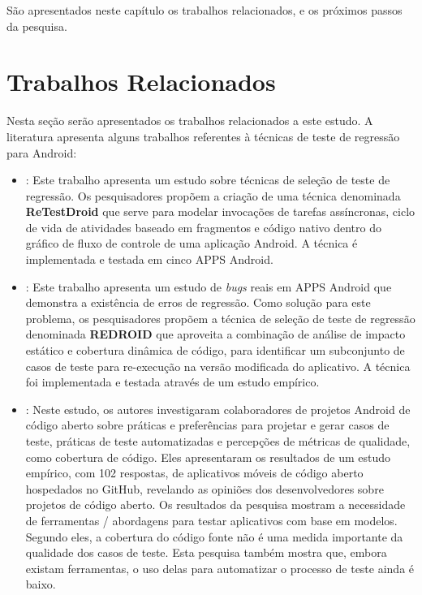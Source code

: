 \acresetall
São apresentados neste capítulo os trabalhos relacionados, e os próximos passos da pesquisa.

\section{Trabalhos Relacionados}

Nesta seção serão apresentados os trabalhos relacionados a este estudo. A literatura apresenta alguns trabalhos referentes à técnicas de teste de regressão para Android:

\begin{itemize}
    
    \item \cite{8377661}: Este trabalho apresenta um estudo sobre técnicas de seleção de teste de regressão. Os pesquisadores propõem a criação de uma técnica denominada \textbf{ReTestDroid} que serve para modelar invocações de tarefas assíncronas, ciclo de vida de atividades baseado em fragmentos e código nativo dentro do gráfico de fluxo de controle de uma aplicação Android. A técnica é implementada e testada em cinco \ac{APPS} Android.
    
    \item \cite{Do2016RedroidAR}: Este trabalho apresenta um estudo de \textit{bugs} reais em \ac{APPS} Android que demonstra a existência de erros de regressão. Como solução para este problema, os pesquisadores propõem a técnica de seleção de teste de regressão denominada \textbf{REDROID} que aproveita a combinação de análise de impacto estático e cobertura dinâmica de código, para identificar um subconjunto de casos de teste para re-execução na versão modificada do aplicativo. A técnica foi implementada e testada através de um estudo empírico.
    
    \item \cite{8094467}: Neste estudo, os autores investigaram colaboradores de projetos Android de código aberto sobre práticas e preferências para projetar e gerar casos de teste, práticas de teste automatizadas e percepções de métricas de qualidade, como cobertura de código. Eles apresentaram os resultados de um estudo empírico, com 102 respostas, de aplicativos móveis de código aberto hospedados no GitHub, revelando as opiniões dos desenvolvedores sobre projetos de código aberto. Os resultados da pesquisa mostram a necessidade de ferramentas / abordagens para testar aplicativos com base em modelos. Segundo eles, a cobertura do código fonte não é uma medida importante da qualidade dos casos de teste. Esta pesquisa também mostra que, embora existam ferramentas, o uso delas para automatizar o processo de teste ainda é baixo.
    

\end{itemize}

